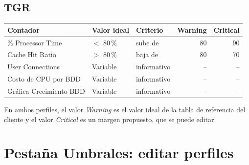 \documentclass[11pt,a4paper,oneside]{report}
\begin{document}
\subsection*{TGR}
\begin{center}
\small
\begin{tabularx}{\textwidth}{XL{3.0cm}lrr}
  \toprule
  Contador & Valor ideal & Criterio & Warning & Critical \\
  \midrule
  \% Processor Time & $<$ 80\,\% & sube de & 80 & 90 \\
  Cache Hit Ratio & $>$ 80\,\% & baja de & 80 & 70 \\
  User Connections & Variable & informativo & -- & -- \\
  Costo de CPU por BDD & Variable & informativo & -- & -- \\
  Gráfica Crecimiento BDD & Variable & informativo & -- & -- \\
  \bottomrule
\end{tabularx}
\end{center}

En ambos perfiles, el valor \emph{Warning} es el valor ideal de la tabla de
referencia del cliente y el valor \emph{Critical} es un margen propuesto, que
se puede editar.

\section{Pestaña Umbrales: editar perfiles}
\end{document}
